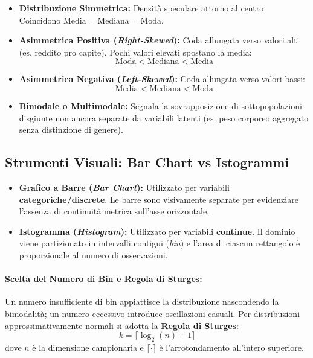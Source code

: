 \begin{itemize}
    \item \textbf{Distribuzione Simmetrica:} Densit\`a speculare attorno al centro. Coincidono $\text{Media} = \text{Mediana} = \text{Moda}$.
    \item \textbf{Asimmetrica Positiva (\textit{Right-Skewed}):} Coda allungata verso valori alti (es. reddito pro capite). Pochi valori elevati spostano la media:
    \begin{equation}
        \text{Moda} < \text{Mediana} < \text{Media}
    \end{equation}
    \item \textbf{Asimmetrica Negativa (\textit{Left-Skewed}):} Coda allungata verso valori bassi:
    \begin{equation}
        \text{Media} < \text{Mediana} < \text{Moda}
    \end{equation}
    \item \textbf{Bimodale o Multimodale:} Segnala la sovrapposizione di sottopopolazioni disgiunte non ancora separate da variabili latenti (es. peso corporeo aggregato senza distinzione di genere).
\end{itemize}

\subsection{Strumenti Visuali: Bar Chart vs Istogrammi}
\begin{itemize}
    \item \textbf{Grafico a Barre (\textit{Bar Chart}):} Utilizzato per variabili \textbf{categoriche/discrete}. Le barre sono visivamente separate per evidenziare l'assenza di continuit\`a metrica sull'asse orizzontale.
    \item \textbf{Istogramma (\textit{Histogram}):} Utilizzato per variabili \textbf{continue}. Il dominio viene partizionato in intervalli contigui (\textit{bin}) e l'area di ciascun rettangolo \`e proporzionale al numero di osservazioni.
\end{itemize}

\paragraph{Scelta del Numero di Bin e Regola di Sturges:}
Un numero insufficiente di bin appiattisce la distribuzione nascondendo la bimodalit\`a; un numero eccessivo introduce oscillazioni casuali. Per distribuzioni approssimativamente normali si adotta la \textbf{Regola di Sturges}:
\begin{equation}
    k = \lceil \log_2(n) + 1 \rceil
\end{equation}
dove $n$ \`e la dimensione campionaria e $\lceil \cdot \rceil$ \`e l'arrotondamento all'intero superiore.

